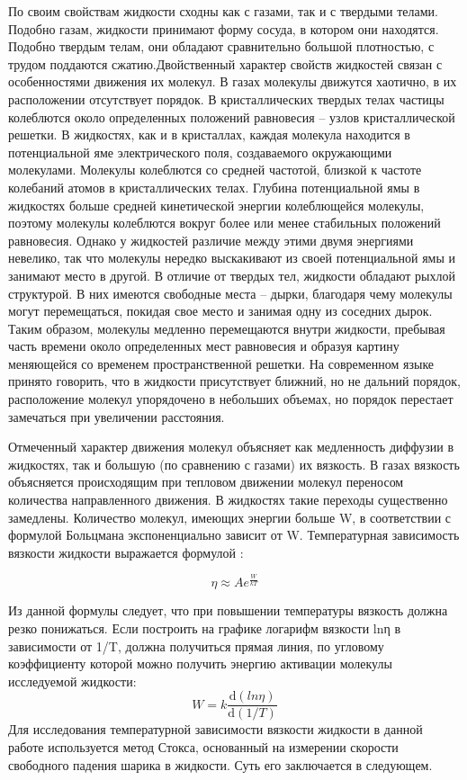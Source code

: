 \documentclass[12pt,a4paper]{article}
\begin{document}
По своим свойствам жидкости сходны как с газами, так и с твердыми телами. Подобно газам, жидкости принимают форму сосуда, в котором они находятся. Подобно твердым телам, они обладают сравнительно большой плотностью, с трудом поддаются сжатию.Двойственный характер свойств жидкостей связан с особенностями движения их молекул. В газах молекулы движутся хаотично, в их расположении отсутствует порядок. В кристаллических твердых
телах частицы колеблются около определенных положений равновесия -- узлов кристаллической решетки. В жидкостях, как и в кристаллах, каждая молекула находится в потенциальной яме электрического поля, создаваемого окружающими молекулами. Молекулы колеблются со средней частотой, близкой к частоте колебаний атомов в кристаллических телах. Глубина потенциальной ямы в жидкостях больше средней кинетической энергии колеблющейся молекулы, поэтому молекулы колеблются вокруг более или менее стабильных положений равновесия. Однако у жидкостей различие между этими двумя энергиями невелико, так что молекулы нередко выскакивают из своей потенциальной ямы и занимают место в другой. В отличие от твердых тел, жидкости обладают  рыхлой структурой. В них имеются свободные места  -- дырки, благодаря чему молекулы могут перемещаться, покидая свое место и занимая одну из соседних дырок. Таким образом, молекулы медленно перемещаются внутри жидкости, пребывая часть времени около определенных мест равновесия и образуя картину меняющейся со временем пространственной решетки. На современном языке принято говорить, что в жидкости присутствует ближний, но не дальний порядок, расположение молекул упорядочено в небольших объемах, но порядок перестает замечаться при увеличении расстояния.

Отмеченный характер движения молекул объясняет как медленность диффузии в жидкостях, так и большую (по сравнению с газами) их вязкость. В газах вязкость объясняется происходящим при тепловом движении молекул переносом количества направленного движения. В жидкостях такие переходы существенно замедлены. Количество молекул, имеющих энергии больше W, в соответствии с формулой Больцмана экспоненциально зависит от W. Температурная зависимость вязкости жидкости выражается формулой :

\begin{equation}
\eta \approx Ae^{\frac{W}{kT}}
\label{eq:viscosity}
\end{equation}


Из данной формулы следует, что при повышении температуры вязкость должна резко понижаться. Если построить на графике логарифм вязкости lnη в зависимости от 1/T, должна получиться прямая линия, по угловому коэффициенту которой можно получить энергию активации молекулы исследуемой жидкости: 
\begin{equation}
W=k\frac{\text{d}(ln\eta)}{\text{d}(1/T)}
\label{eq:formula_for_graph}
\end{equation}
Для исследования температурной зависимости вязкости жидкости в данной работе используется метод Стокса, основанный на измерении скорости свободного падения шарика в жидкости. Суть его заключается в следующем.
\end{document}
